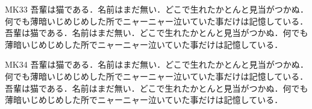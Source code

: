 \documentclass[fontsize=10pt,twocolumn]{jlreq}
\begin{document}
MK33 吾輩は猫である．名前はまだ無い．どこで生れたかとんと見当がつかぬ．何でも薄暗いじめじめした所でニャーニャー泣いていた事だけは記憶している． 吾輩は猫である．名前はまだ無い．どこで生れたかとんと見当がつかぬ．何でも薄暗いじめじめした所でニャーニャー泣いていた事だけは記憶している．\par
{}MK34 吾輩は猫である．名前はまだ無い．どこで生れたかとんと見当がつかぬ．何でも薄暗いじめじめした所でニャーニャー泣いていた事だけは記憶している． 吾輩は猫である．名前はまだ無い．どこで生れたかとんと見当がつかぬ．何でも薄暗いじめじめした所でニャーニャー泣いていた事だけは記憶している．\par
\end{document}

